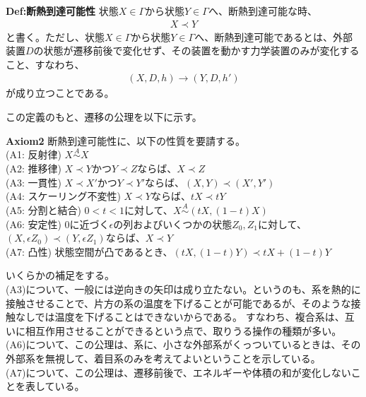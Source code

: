 \documentclass[a4paper,11pt]{jsarticle}
\numberwithin{equation}{section}
\begin{document}
\begin{itembox}[l]{\textbf{Def:断熱到達可能性}}
  状態$X \in \Gamma$から状態$Y \in \Gamma$へ、断熱到達可能な時、
  \begin{align}
    X \prec Y
  \end{align}
  と書く。ただし、状態$X \in \Gamma$から状態$Y \in \Gamma$へ、断熱到達可能であるとは、外部装置$D$の状態が遷移前後で変化せず、その装置を動かす力学装置のみが変化すること、すなわち、
  \begin{align}
    (X , D , h) \rightarrow (Y , D , h')
  \end{align}
  が成り立つことである。

\end{itembox}

この定義のもと、遷移の公理を以下に示す。\\

\begin{itembox}[l]{\textbf{Axiom2}}
  断熱到達可能性に、以下の性質を要請する。\\
    (A1: 反射律) $ X \overset{A}{\sim} X$\\
    (A2: 推移律) $X \prec Y$かつ$Y \prec Z$ならば、$X \prec Z$\\
    (A3: 一貫性) $X \prec X'$かつ$Y \prec Y'$ならば、$(X,Y) \prec (X',Y')$\\
    (A4: スケーリング不変性) $X \prec Y$ならば、$tX \prec tY$\\
    (A5: 分割と結合) $0<t<1$に対して、$X \overset{A}{\sim} (tX,(1-t)X)$\\
    (A6: 安定性) 0に近づく$\epsilon$の列およびいくつかの状態$Z_0,Z_1$に対して、$(X,\epsilon Z_0) \prec (Y,\epsilon Z_1)$ならば、$X \prec Y$ \\
    (A7: 凸性) 状態空間が凸であるとき、$(tX,(1-t)Y) \prec tX+(1-t)Y$
\end{itembox}
いくらかの補足をする。\\
(A3)について、一般には逆向きの矢印は成り立たない。というのも、系を熱的に接触させることで、片方の系の温度を下げることが可能であるが、そのような接触なしでは温度を下げることはできないからである。
すなわち、複合系は、互いに相互作用させることができるという点で、取りうる操作の種類が多い。\\

(A6)について、この公理は、系に、小さな外部系がくっついているときは、その外部系を無視して、着目系のみを考えてよいということを示している。\\

(A7)について、この公理は、遷移前後で、エネルギーや体積の和が変化しないことを表している。
\end{document}
